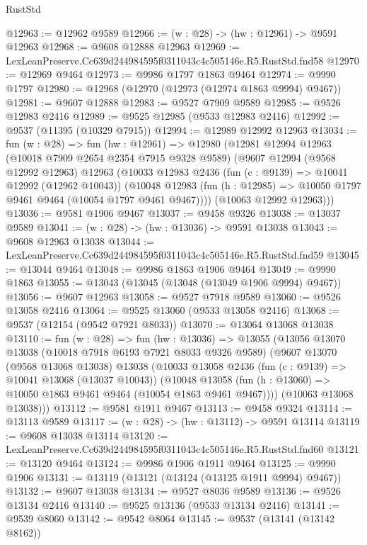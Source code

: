 \begin{lexlean}{RustStd}
\begin{coremodule}
@12963 := @12962 @9589
@12966 := (w : @28) -> (hw : @12961) -> @9591 @12963
@12968 := @9608 @12888 @12963
@12969 := LexLeanPreserve.Cc639d244984595f0311043c4c505146e.R5.RustStd.fnd58
@12970 := @12969 @9464
@12973 := @9986 @1797 @1863 @9464
@12974 := @9990 @1797
@12980 := @12968 (@12970 (@12973 (@12974 @1863 @9994) @9467))
@12981 := @9607 @12888
@12983 := @9527 @7909 @9589
@12985 := @9526 @12983 @2416
@12989 := @9525 @12985 (@9533 @12983 @2416)
@12992 := @9537 (@11395 (@10329 @7915))
@12994 := @12989 @12992 @12963
@13034 := fun (w : @28) =>
  fun (hw : @12961) =>
  @12980
    (@12981
      @12994
      @12963
      (@10018 @7909 @2654 @2354 @7915 @9328 @9589)
      (@9607
        @12994
        (@9568 @12992 @12963)
        @12963
        (@10033
          @12983
          @2436
          (fun (c : @9139) => @10041 @12992 (@12962 @10043))
          (@10048 @12983 (fun (h : @12985) => @10050 @1797 @9461 @9464 (@10054 @1797 @9461 @9467))))
        (@10063 @12992 @12963)))
@13036 := @9581 @1906 @9467
@13037 := @9458 @9326
@13038 := @13037 @9589
@13041 := (w : @28) -> (hw : @13036) -> @9591 @13038
@13043 := @9608 @12963 @13038
@13044 := LexLeanPreserve.Cc639d244984595f0311043c4c505146e.R5.RustStd.fnd59
@13045 := @13044 @9464
@13048 := @9986 @1863 @1906 @9464
@13049 := @9990 @1863
@13055 := @13043 (@13045 (@13048 (@13049 @1906 @9994) @9467))
@13056 := @9607 @12963
@13058 := @9527 @7918 @9589
@13060 := @9526 @13058 @2416
@13064 := @9525 @13060 (@9533 @13058 @2416)
@13068 := @9537 (@12154 (@9542 @7921 @8033))
@13070 := @13064 @13068 @13038
@13110 := fun (w : @28) =>
  fun (hw : @13036) =>
  @13055
    (@13056
      @13070
      @13038
      (@10018 @7918 @6193 @7921 @8033 @9326 @9589)
      (@9607
        @13070
        (@9568 @13068 @13038)
        @13038
        (@10033
          @13058
          @2436
          (fun (c : @9139) => @10041 @13068 (@13037 @10043))
          (@10048 @13058 (fun (h : @13060) => @10050 @1863 @9461 @9464 (@10054 @1863 @9461 @9467))))
        (@10063 @13068 @13038)))
@13112 := @9581 @1911 @9467
@13113 := @9458 @9324
@13114 := @13113 @9589
@13117 := (w : @28) -> (hw : @13112) -> @9591 @13114
@13119 := @9608 @13038 @13114
@13120 := LexLeanPreserve.Cc639d244984595f0311043c4c505146e.R5.RustStd.fnd60
@13121 := @13120 @9464
@13124 := @9986 @1906 @1911 @9464
@13125 := @9990 @1906
@13131 := @13119 (@13121 (@13124 (@13125 @1911 @9994) @9467))
@13132 := @9607 @13038
@13134 := @9527 @8036 @9589
@13136 := @9526 @13134 @2416
@13140 := @9525 @13136 (@9533 @13134 @2416)
@13141 := @9539 @8060
@13142 := @9542 @8064
@13145 := @9537 (@13141 (@13142 @8162))

\end{coremodule}
\end{lexlean}
